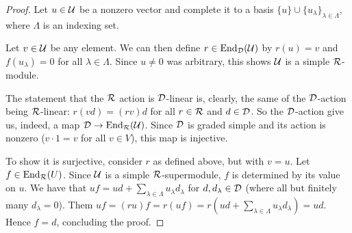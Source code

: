 \begin{proof}
	Let $u \in \mathcal U$ be a nonzero vector and complete it to a basis $\{u\} \cup \{ u_\lambda\}_{\lambda \in \Lambda}$, where $\Lambda$ is an indexing set.

	Let $v\in \mathcal U$ be any element. We can then define $r\in \operatorname{End}_{\mathcal{D}} (\mathcal U)$ by $r(u) = v$ and $f(u_\lambda) = 0$ for all $\lambda \in \Lambda$. Since $u \neq 0$ was arbitrary, this shows $\mathcal U$ is a simple $\mathcal R$-module.

	The statement that the $\mathcal R$ action is $\mathcal{D}$-linear is, clearly, the same of the $\mathcal{D}$-action being $\mathcal R$-linear: $r(vd) = (rv)d$ for all $r\in \mathcal R$ and $d \in \mathcal{D}$. So the $\mathcal{D}$-action give us, indeed, a map $\mathcal{D} \to \operatorname{End}_{\mathcal R} (\mathcal U)$.
	Since $\mathcal{D}$ is graded simple and its action is nonzero ($v\cdot 1 = v$ for all $v \in V$), this map is injective.

	To show it is surjective, consider $r$ as defined above, but with $v = u$. Let $f\in \operatorname{End}_{\mathcal R} (U)$. Since $\mathcal U$ is a simple $\mathcal R$-supermodule, $f$ is determined by its value on $u$.
	We have that $uf = u d + \sum_{\lambda \in \Lambda} u_\lambda d_\lambda$ for $d, d_\lambda \in \mathcal{D}$ (where all but finitely many $d_\lambda = 0$).
	Them $ uf = (ru)f = r(uf) = r(ud + \sum_{\lambda \in \Lambda} u_\lambda d_\lambda )  = ud$. Hence $f = d$, concluding the proof.
\end{proof}




